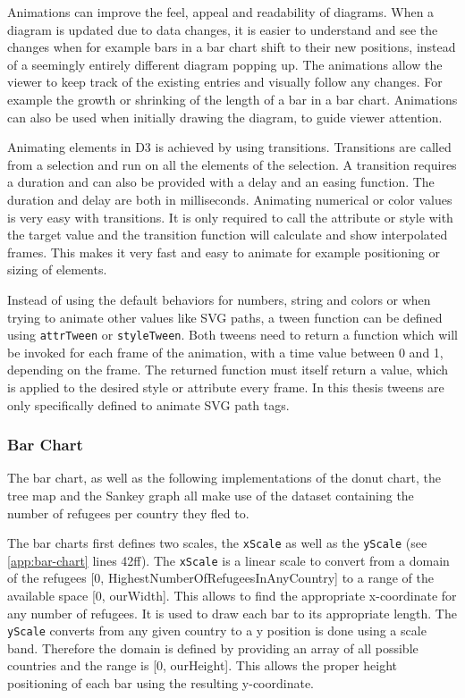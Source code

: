 Animations can improve the feel, appeal and readability of diagrams. When a diagram is updated due to data changes, it is easier to understand and see the changes when for example bars in a bar chart shift to their new positions, instead of a seemingly entirely different diagram popping up. The animations allow the viewer to keep track of the existing entries and visually follow any changes. For example the growth or shrinking of the length of a bar in a bar chart. Animations can also be used when initially drawing the diagram, to guide viewer attention.

Animating elements in D3 is achieved by using transitions. Transitions are called from a selection and run on all the elements of the selection. A transition requires a duration and can also be provided with a delay and an easing function. The duration and delay are both in milliseconds. Animating numerical or color values is very easy with transitions. It is only required to call the attribute or style with the target value and the transition function will calculate and show interpolated frames. This makes it very fast and easy to animate for example positioning or sizing of elements.

Instead of using the default behaviors for numbers, string and colors or when trying to animate other values like SVG paths, a tween function can be defined using \verb|attrTween| or \verb|styleTween|. Both tweens need to return a function which will be invoked for each frame of the animation, with a time value between 0 and 1, depending on the frame. The returned function must itself return a value, which is applied to the desired style or attribute every frame. In this thesis tweens are only specifically defined to animate SVG path tags.


\subsubsection{Bar Chart}
The bar chart, as well as the following implementations of the donut chart, the tree map and the Sankey graph all make use of the dataset containing the number of refugees per country they fled to.

The bar charts first defines two scales, the \texttt{xScale} as well as the \texttt{yScale} (see \ref{app:bar-chart} lines 42ff). The \texttt{xScale} is a linear scale to convert from a domain of the refugees [0, HighestNumberOfRefugeesInAnyCountry] to a range of the available space [0, ourWidth]. This allows to find the appropriate x-coordinate for any number of refugees. It is used to draw each bar to its appropriate length. The \texttt{yScale} converts from any given country to a y position is done using a scale band. Therefore the domain is defined by providing an array of all possible countries and the range is [0, ourHeight]. This allows the proper height positioning of each bar using the resulting y-coordinate.

